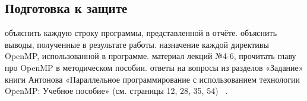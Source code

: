 \subsection{Подготовка к защите}

\begin{enumerate}
     объяснить каждую строку программы, представленной в отчёте.
     объяснить выводы, полученные в результате работы.
     назначение каждой директивы OpenMP, использованной в программе.
     материал лекций №4-6, прочитать главу про OpenMP в методическом пособии.
     ответы на вопросы из разделов «Задание» книги Антонова «Параллельное программирование с использованием технологии OpenMP: Учебное пособие» (см. страницы 12, 28, 35, 54)~%
    \cite{AntonovOpenMP2004}.
\end{enumerate}
